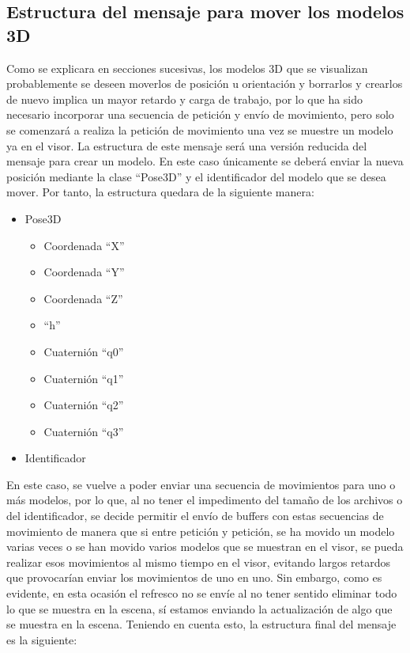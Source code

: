 \subsection{Estructura del mensaje para mover los modelos 3D}
Como se explicara en secciones sucesivas, los modelos 3D que se visualizan probablemente se deseen moverlos de posición u orientación y borrarlos y crearlos de nuevo implica un mayor retardo y carga de trabajo, por lo que ha sido necesario incorporar una secuencia de petición y envío de movimiento, pero solo se comenzará a realiza la petición de movimiento una vez se muestre un modelo ya en el visor. La estructura de este mensaje será una versión reducida del mensaje para crear un modelo. En este caso únicamente se deberá enviar la nueva posición mediante la clase ``Pose3D'' y el identificador del modelo que se desea mover. Por tanto, la estructura quedara de la siguiente manera:
\begin{itemize}
	\item	Pose3D
	\begin{itemize}
		\item Coordenada ``X''
		\item Coordenada ``Y''
		\item Coordenada ``Z''
		\item ``h''
		\item Cuaternión ``q0''
		\item Cuaternión ``q1''
		\item Cuaternión ``q2''
		\item Cuaternión ``q3''
	\end{itemize}
	\item Identificador
\end{itemize}
En este caso, se vuelve a poder enviar una secuencia de movimientos para uno o más modelos, por lo que, al no tener el impedimento del tamaño de los archivos o del identificador, se decide permitir el envío de buffers con estas secuencias de movimiento de manera que si entre petición y petición, se ha movido un modelo varias veces o se han movido varios modelos que se muestran en el visor, se pueda realizar esos movimientos al mismo tiempo en el visor, evitando largos retardos que provocarían enviar los movimientos de uno en uno. Sin embargo, como es evidente, en esta ocasión el refresco no se envíe al no tener sentido eliminar todo lo que se muestra en la escena, sí estamos enviando la actualización de algo que se muestra en la escena. Teniendo en cuenta esto, la estructura final del mensaje es la siguiente:

